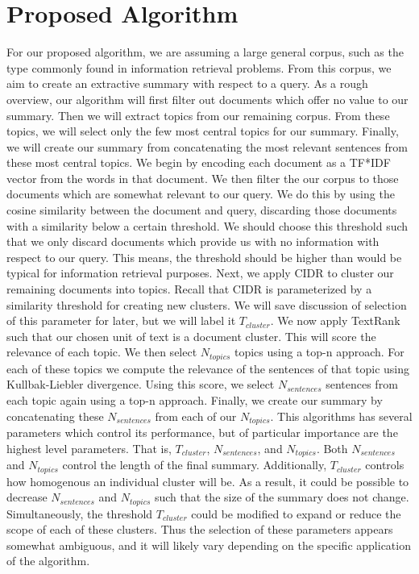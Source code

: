\documentclass[11pt]{article}
\begin{document}
\section{Proposed Algorithm}
\label{sec:orgb2cfc18}
For our proposed algorithm, we are assuming a large general corpus, such as the type commonly found in information retrieval problems. From this corpus, we aim to create an extractive summary with respect to a query. As a rough overview, our algorithm will first filter out documents which offer no value to our summary. Then we will extract topics from our remaining corpus. From these topics, we will select only the few most central topics for our summary. Finally, we will create our summary from concatenating the most relevant sentences from these most central topics.
We begin by encoding each document as a TF*IDF vector from the words in that document. We then filter the our corpus to those documents which are somewhat relevant to our query. We do this by using the cosine similarity between the document and query, discarding those documents with a similarity below a certain threshold. We should choose this threshold such that we only discard documents which provide us with no information with respect to our query. This means, the threshold should be higher than would be typical for information retrieval purposes. Next, we apply CIDR to cluster our remaining documents into topics. Recall that CIDR is parameterized by a similarity threshold for creating new clusters. We will save discussion of selection of this parameter for later, but we will label it \(T_{cluster}\). We now apply TextRank such that our chosen unit of text is a document cluster. This will score the relevance of each topic. We then select \(N_{topics}\) topics using a top-n approach. For each of these topics we compute the relevance of the sentences of that topic using Kullbak-Liebler divergence. Using this score, we select \(N_{sentences}\) sentences from each topic again using a top-n approach. Finally, we create our summary by concatenating these \(N_{sentences}\) from each of our \(N_{topics}\).
This algorithms has several parameters which control its performance, but of particular importance are the highest level parameters. That is, \(T_{cluster}\), \(N_{sentences}\), and \(N_{topics}\). Both \(N_{sentences}\) and \(N_{topics}\) control the length of the final summary. Additionally, \(T_{cluster}\) controls how homogenous an individual cluster will be. As a result, it could be possible to decrease \(N_{sentences}\) and \(N_{topics}\) such that the size of the summary does not change. Simultaneously, the threshold \(T_{cluster}\) could be modified to expand or reduce the scope of each of these clusters. Thus the selection of these parameters appears somewhat ambiguous, and it will likely vary depending on the specific application of the algorithm.
\end{document}
